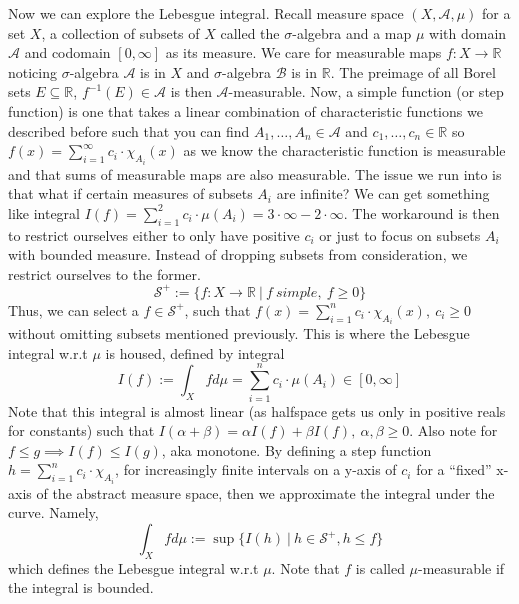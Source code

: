 \documentclass[titlepage]{book}
\begin{document}
\begin{flushleft}
    Now we can explore the Lebesgue integral. Recall measure space $(X, \mathcal{A}, \mu)$ for
     a set $X$, a collection of subsets of $X$ called the $\sigma$-algebra and a map $\mu$ with domain $\mathcal{A}$ and codomain $[0, \infty]$ as its measure. We care for measurable maps $f: X \rightarrow \mathbb{R}$ noticing $\sigma$-algebra $\mathcal{A}$ is in $X$ and $\sigma$-algebra $\mathcal{B}$ is in $\mathbb{R}$. The preimage of all Borel sets $E \subseteq \mathbb{R}$, $f^{-1}(E) \in \mathcal{A}$ is then $\mathcal{A}$-measurable. Now, a simple function (or step function) is one that takes a linear combination of characteristic functions we described before such that you can find $A_1, \ldots, A_n \in \mathcal{A}$ and $c_1, \ldots, c_n \in \mathbb{R}$ so $f(x) = \sum_{i = 1}^{\infty}c_i \cdot \chi_{A_i}(x)$ as we know the characteristic function is measurable and that sums of measurable maps are also measurable.
     The issue we run into is that what if certain measures of subsets $A_i$ are infinite? We can get something like integral $I(f) = \sum_{i=1}^{2}c_i \cdot \mu(A_i) = 3 \cdot \infty - 2 \cdot\infty$. The workaround is then to restrict ourselves either to only have positive $c_i$ or just to focus on subsets $A_i$ with bounded measure. Instead of dropping subsets from consideration, we restrict ourselves to the former. 
     $$\mathcal{S}^{+} := \{f: X \rightarrow \mathbb{R} ~|~ f~simple,~f \geq 0\}$$ Thus, we can select a $f \in \mathcal{S}^+$, such that $f(x) = \sum_{i=1}^{n}c_i \cdot \chi_{A_i}(x),~c_i \geq 0$ without omitting subsets mentioned previously. This is where the Lebesgue integral w.r.t $\mu$ is housed, defined by integral $$I(f) := \int_X f d\mu = \sum_{i=1}^{n}c_i \cdot \mu(A_i) \in [0, \infty]$$
     Note that this integral is almost linear (as halfspace gets us only in positive reals for constants) such that $I(\alpha + \beta) = \alpha I(f) + \beta I(f),~\alpha, \beta \geq 0$. Also note for $f \leq g \implies I(f) \leq I(g)$, aka monotone. By defining a step function $h = \sum_{i=1}^{n}c_i \cdot \chi_{A_i}$, for increasingly finite intervals on a y-axis of $c_i$ for a ``fixed'' x-axis of the abstract measure space, then we approximate the integral under the curve. 
     Namely, $$\int_X f d\mu := \sup \{I(h)~|~h \in \mathcal{S}^+, h \leq f\}$$ which defines the Lebesgue integral w.r.t $\mu$. Note that $f$ is called $\mu$-measurable if the integral is bounded.
\end{flushleft}

\mainmatter


\end{document}
